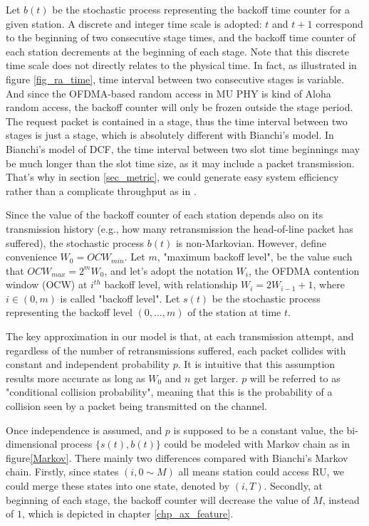 Let $b(t)$ be the stochastic process representing the backoff time counter for a given station.
A discrete and integer time scale is adopted: $t$ and $t+1$ correspond to the beginning of two consecutive stage times, and the backoff time counter of each station decrements at the beginning of each stage.
Note that this discrete time scale does not directly relates to the physical time.
In fact, as illustrated in figure \ref{fig_ra_time}, time interval between two consecutive stages is variable.
And since the OFDMA-based random access in MU PHY is kind of Aloha random access, the backoff counter will only be frozen outside the stage period. 
The request packet is contained in a stage, thus the time interval between two stages is just a stage, which is absolutely different with Bianchi's model.
In Bianchi's model of DCF, the time interval between two slot time beginnings may be much longer than the slot time size, as it may include a packet transmission. 
That's why in section \ref{sec_metric}, we could generate easy system efficiency rather than a complicate throughput as in \cite{bianchi2000performance}.

Since the value of the backoff counter of each station depends also on its transmission history (e.g., how many retransmission the head-of-line packet has suffered), the stochastic process $b(t)$ is non-Markovian.
However, define convenience $W_0=OCW_{min}$. 
Let $m$, "maximum backoff level", be the value such that $OCW_{max}=2^mW_0$, and let's adopt the notation $W_i$, the OFDMA contention window (OCW) at $i^{th}$ backoff level, with relationship $W_i = 2W_{i-1}+1$, where $i\in (0,m)$ is called "backoff level".
Let $s(t)$ be the stochastic process representing the backoff level $(0,...,m)$ of the station at time $t$.

The key approximation in our model is that, at each transmission attempt, and regardless of the number of retransmissions suffered, each packet collides with constant and independent probability $p$. It is intuitive that this assumption results more accurate as long as $W_0$ and $n$ get larger. $p$ will be referred to as "conditional collision probability", meaning that this is the probability of a collision seen by a packet being transmitted on the channel.

Once independence is assumed, and $p$ is supposed to be a constant value, the bi-dimensional process $\lbrace s(t),b(t) \rbrace$ could be modeled with Markov chain as in figure\ref{Markov}. 
There mainly two differences compared with Bianchi's Markov chain.
Firstly, since states $( i,0\sim M )$ all means station could access RU, we could merge these states into one state, denoted by $( i, T )$. 
Secondly, at beginning of each stage, the backoff counter will decrease the value of $M$, instead of $1$, which is depicted in chapter \ref{chp_ax_feature}.

